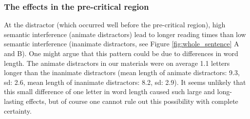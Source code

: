 \documentclass[a4paper, man, floatsintext]{apa7}
\begin{document}
\subsubsection{The effects in the pre-critical region}

At the distractor (which occurred well before the pre-critical region), high semantic interference (animate distractors) lead to longer reading times than low semantic interference (inanimate distractors, see Figure \ref{fig:whole_sentence} A and B). One might argue that this pattern could be due to differences in word length. The animate distractors in our materials were on average 1.1 letters longer than the inanimate distractors (mean length of animate distractors: 9.3, sd: 2.6, mean length of inanimate distractors: 8.2, sd: 2.9). It seems unlikely that this small difference of one letter in word length caused such large and long-lasting effects, but of course one cannot rule out this possibility with complete certainty.
\end{document}
